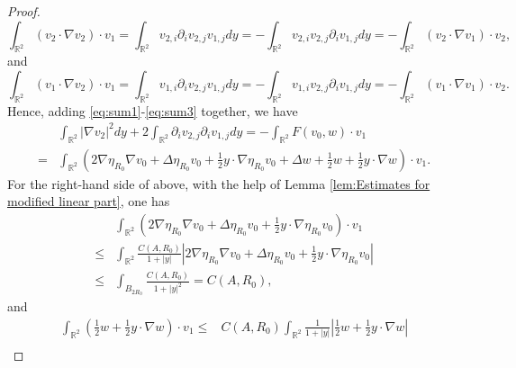 \documentclass[12pt]{amsart}
\numberwithin{equation}{section}              %
\theoremstyle{remark}
\begin{document}
\begin{proof}
			\begin{equation*}
				\int_{\mathbb{R}^2}(v_2 \cdot \nabla v_2)\cdot  v_1 = 	\int_{\mathbb{R}^2}v_{2,i}\partial _i v_{2,j} v_{1,j}dy =- \int_{\mathbb{R}^2}v_{2,i} v_{2,j} \partial _i v_{1,j}dy = - \int_{\mathbb{R}^2 } (v_2\cdot \nabla v_1) \cdot v_2,
			\end{equation*}
			and 
			\begin{equation*}
				\int_{\mathbb{R}^2}( v_1  \cdot \nabla v_2)\cdot  v_1 = 
				\int_{\mathbb{R}^2}{v}_{1,i}\partial _i v_{2,j} v_{1,j}dy =- \int_{\mathbb{R}^2}{v}_{1,i} v_{2,j} \partial _i v_{1,j}dy =
				-\int_{\mathbb{R}^2 } ( v_1\cdot \nabla v_1) \cdot v_2.
			\end{equation*}
			Hence, adding \eqref{eq:sum1}-\eqref{eq:sum3} together, we have
			\begin{equation}\label{eq:enerid}
				\begin{aligned}
					&\int_{\mathbb{R}^2} |\nabla v_2|^2 dy + 2\int_{\mathbb{R}^2} \partial_i v_{2,j} \partial_i v_{1,j} dy=-\int_{\mathbb{R}^2} F(v_0,w) \cdot v_1\\
					= & \int_{\mathbb{R}^2} \left(2 \nabla \eta_{R_0}\nabla 	v_0+\Delta \eta_{R_0}	v_0   +\frac{1}{2}y\cdot \nabla \eta_{R_0}	 v_0 + \Delta w  + \frac{1}{2} w + \frac{1}{2}y\cdot \nabla  w\right)\cdot v_1.
				\end{aligned}
			\end{equation}
			For the right-hand side of above, 
with the help of Lemma \ref{lem:Estimates for modified linear part}, one has
			\begin{equation*}
				\begin{aligned}
					&\int_{\mathbb{R}^2} \left(2 \nabla \eta_{R_0}\nabla 	v_0+\Delta \eta_{R_0}	v_0   +\frac{1}{2}y\cdot \nabla \eta_{R_0}	 v_0 \right)\cdot v_1\\
					\leq 
					& \int_{\mathbb{R}^2} \frac{C(A,R_0)}{1+|y|}\left|2 \nabla \eta_{R_0}\nabla 	v_0 + \Delta \eta_{R_0}	v_0  + \frac{1}{2}y\cdot \nabla \eta_{R_0}	 v_0 \right|\\
					\leq & \int_{B_{2R_0}} \frac{C(A,R_0)}{1+|y|^2} = C(A,R_0),
				\end{aligned}
			\end{equation*}
			and
			\begin{equation*}
				\begin{aligned}
					\int_{\mathbb{R}^2} \left(\frac{1}{2} w +\frac{1}{2}y\cdot \nabla  w\right)\cdot v_1
					\leq	& C(A,R_0)\int_{\mathbb{R}^2} \frac{1}{1+|y|}\left|\frac{1}{2} w +\frac{1}{2}y\cdot \nabla  w\right|\\

\end{aligned}
\end{equation*}
\end{proof}
\end{document}
